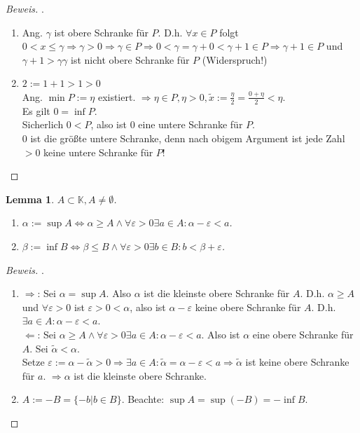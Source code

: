 \documentclass[12pt,a4paper,titlepage]{article} %
\newtheorem{lem}{Lemma}
\theoremstyle{definition}
\theoremstyle{remark}
\newenvironment{bew}{\begin{proof}[Beweis]}{\end{proof}}
\begin{document}
\begin{bew} . %
	\begin{enumerate}
		\item Ang. $\gamma$ ist obere Schranke für $P$. D.h. $\forall x\in P$ folgt $0<x\leq\gamma\Rightarrow\gamma >0\Rightarrow \gamma \in P \Rightarrow 0 < \gamma = \gamma + 0 < \gamma + 1 \in P\Rightarrow\gamma + 1\in P$ und $\gamma +1>\gamma \gamma$ ist nicht obere Schranke für $P$ (Widerspruch!) \Lightning
		\item $2:= 1+1 > 1>0$\\
		Ang. $\min P := \eta$ existiert. $\Rightarrow \eta \in P, \eta > 0, \tilde{x} := \frac{\eta}{2} = \frac{0 + \eta}{2} < \eta$.\\
		Es gilt $0 = \inf P$.\\
		Sicherlich $0<P$, also ist $0$ eine untere Schranke für $P$.\\
		$0$ ist die größte untere Schranke, denn nach obigem Argument ist jede Zahl $>0$ keine untere Schranke für $P$!
	\end{enumerate}
\end{bew}
\begin{lem}
	$A\subset\mathbb{K}, A\neq \emptyset$.
	\begin{enumerate}
		\item $\alpha := \sup A \Leftrightarrow \alpha \geq A \wedge \forall \varepsilon > 0 \exists a \in A: \alpha - \varepsilon < a$.
		\item $\beta := \inf B \Leftrightarrow \beta \leq B \wedge \forall \varepsilon > 0 \exists b \in B: b < \beta + \varepsilon$.
	\end{enumerate}
\end{lem}
\begin{bew} .%
	\begin{enumerate}
		\item \glqq $\Rightarrow$\grqq: Sei $\alpha = \sup A$. Also $\alpha$ ist die kleinste obere Schranke für $A$. D.h. $\alpha \geq A$ und $\forall \varepsilon > 0$ ist $\varepsilon>0<\alpha$, also ist $\alpha-\varepsilon$ keine obere Schranke für $A$. D.h. $\exists a\in A:\alpha - \varepsilon <a$.\\
		\glqq $\Leftarrow$\grqq: Sei $\alpha \geq A \wedge \forall \varepsilon > 0 \exists a \in A: \alpha - \varepsilon < a$. Also ist $\alpha$ eine obere Schranke für $A$. Sei $\tilde{\alpha}<\alpha$.\\
		Setze $\varepsilon:= \alpha -\tilde{\alpha} > 0 \Rightarrow \exists a \in A: \tilde{\alpha} = \alpha - \varepsilon < a \Rightarrow \tilde{\alpha}$ ist keine obere Schranke für $a$. $\Rightarrow\alpha$ ist die kleinste obere Schranke.
		\item $A:= -B = \{-b|b \in B\}$. Beachte: $\sup A = \sup(-B) = -\inf B$.
	\end{enumerate}
\end{bew}
\end{document}
